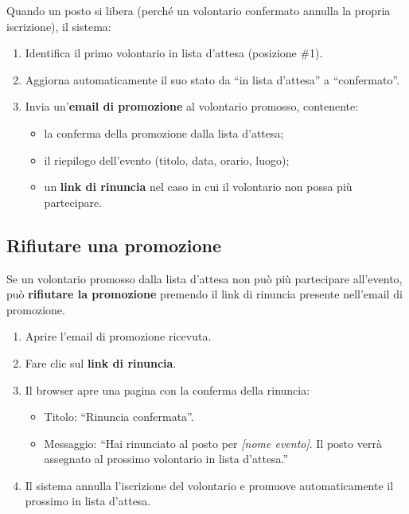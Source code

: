 \documentclass[a4paper,11pt,oneside]{book}
\begin{document}
Quando un posto si libera (perch\'e un volontario confermato annulla la propria iscrizione), il sistema:

\begin{enumerate}[leftmargin=1.5em]
  \item Identifica il primo volontario in lista d'attesa (posizione \#1).
  \item Aggiorna automaticamente il suo stato da ``in lista d'attesa'' a ``confermato''.
  \item Invia un'\textbf{email di promozione} al volontario promosso, contenente:
    \begin{itemize}
      \item la conferma della promozione dalla lista d'attesa;
      \item il riepilogo dell'evento (titolo, data, orario, luogo);
      \item un \textbf{link di rinuncia} nel caso in cui il volontario non possa pi\`u partecipare.
    \end{itemize}
\end{enumerate}

\subsection{Rifiutare una promozione}

Se un volontario promosso dalla lista d'attesa non pu\`o pi\`u partecipare all'evento, pu\`o \textbf{rifiutare la promozione} premendo il link di rinuncia presente nell'email di promozione.

\begin{enumerate}[leftmargin=1.5em]
  \item Aprire l'email di promozione ricevuta.
  \item Fare clic sul \textbf{link di rinuncia}.
  \item Il browser apre una pagina con la conferma della rinuncia:
    \begin{itemize}
      \item Titolo: ``Rinuncia confermata''.
      \item Messaggio: ``Hai rinunciato al posto per \textit{[nome evento]}. Il posto verr\`a assegnato al prossimo volontario in lista d'attesa.''
    \end{itemize}
  \item Il sistema annulla l'iscrizione del volontario e promuove automaticamente il prossimo in lista d'attesa.
\end{enumerate}
\end{document}
